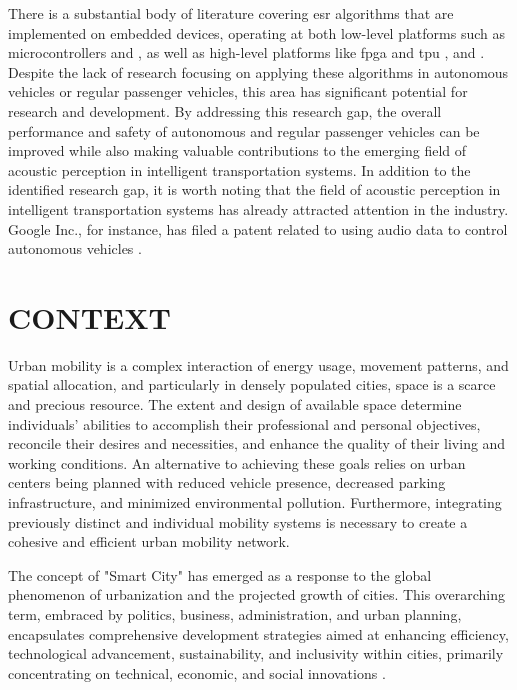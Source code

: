 There is a substantial body of literature covering \gls{esr} algorithms that are implemented on embedded devices, operating at both low-level platforms such as microcontrollers \cite{Abreha2014} and \cite{Nordby2019}, as well as high-level platforms like \gls{fpga} and \gls{tpu} \cite{Silva2019}, \cite{Vandendriessche2021} and \cite{Lhoest2021}. Despite the lack of research focusing on applying these algorithms in autonomous vehicles or regular passenger vehicles, this area has significant potential for research and development. By addressing this research gap, the overall performance and safety of autonomous and regular passenger vehicles can be improved while also making valuable contributions to the emerging field of acoustic perception in intelligent transportation systems. In addition to the identified research gap, it is worth noting that the field of acoustic perception in intelligent transportation systems has already attracted attention in the industry. Google Inc., for instance, has filed a patent related to using audio data to control autonomous vehicles \cite{Ferguson2014}.


\section{CONTEXT}
\label{sec:introduction_context}

Urban mobility is a complex interaction of energy usage, movement patterns, and spatial allocation, and particularly in densely populated cities, space is a scarce and precious resource. The extent and design of available space determine individuals' abilities to accomplish their professional and personal objectives, reconcile their desires and necessities, and enhance the quality of their living and working conditions. An alternative to achieving these goals relies on urban centers being planned with reduced vehicle presence, decreased parking infrastructure, and minimized environmental pollution. Furthermore, integrating previously distinct and individual mobility systems is necessary to create a cohesive and efficient urban mobility network.

The concept of "Smart City" has emerged as a response to the global phenomenon of urbanization and the projected growth of cities. This overarching term, embraced by politics, business, administration, and urban planning, encapsulates comprehensive development strategies aimed at enhancing efficiency, technological advancement, sustainability, and inclusivity within cities, primarily concentrating on technical, economic, and social innovations \cite{EDAG2020}.

